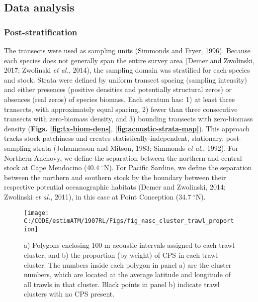 \documentclass[]{article}
\begin{document}
\hypertarget{methods-data-analysis}{%
\subsection{Data analysis}\label{methods-data-analysis}}

\hypertarget{methods-post-stratification}{%
\subsubsection{Post-stratification}\label{methods-post-stratification}}

The transects were used as sampling units (Simmonds and Fryer, 1996). Because each species does not generally span the entire survey area (Demer and Zwolinski, 2017; Zwolinski \emph{et al.}, 2014), the sampling domain was stratified for each species and stock. Strata were defined by uniform transect spacing (sampling intensity) and either presences (positive densities and potentially structural zeros) or absences (real zeros) of species biomass. Each stratum has: 1) at least three transects, with approximately equal spacing, 2) fewer than three consecutive transects with zero-biomass density, and 3) bounding transects with zero-biomass density (\textbf{Figs. \ref{fig:tx-biom-dens}}, \textbf{\ref{fig:acoustic-strata-map}}). This approach tracks stock patchiness and creates statistically-independent, stationary, post-sampling strata (Johannesson and Mitson, 1983; Simmonds \emph{et al.}, 1992). For Northern Anchovy, we define the separation between the northern and central stock at Cape Mendocino (40.4 \(^{\circ}\textrm{N}\)). For Pacific Sardine, we define the separation between the northern and southern stock by the boundary between their respective potential oceanographic habitats (Demer and Zwolinski, 2014; Zwolinski \emph{et al.}, 2011), in this case at Point Conception (34.7 \(^{\circ}\textrm{N}\)).



\begin{figure}[H]

{\centering \texttt{[image: C:/CODE/estimATM/1907RL/Figs/fig\_nasc\_cluster\_trawl\_proportion]} 

}

\caption{a) Polygons enclosing 100-m acoustic intervals assigned to each trawl cluster, and b) the proportion (by weight) of CPS in each trawl cluster. The numbers inside each polygon in panel a) are the cluster numbers, which are located at the average latitude and longitude of all trawls in that cluster. Black points in panel b) indicate trawl clusters with no CPS present.}\label{fig:trawl-cluster-map}
\end{figure}
\end{document}
